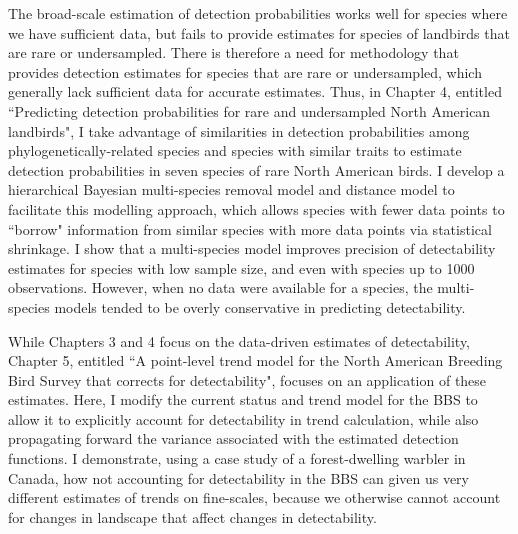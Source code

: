 \par The broad-scale estimation of detection probabilities works well for species where we have sufficient data, but fails to provide estimates for species of landbirds that are rare or undersampled.
There is therefore a need for methodology that provides detection estimates for species that are rare or undersampled, which generally lack sufficient data for accurate estimates. 
Thus, in Chapter 4, entitled ``Predicting detection probabilities for rare and undersampled North American landbirds", I take advantage of similarities in detection probabilities among phylogenetically-related species and species with similar traits to estimate detection probabilities in seven species of rare North American birds.
I develop a hierarchical Bayesian multi-species removal model and distance model to facilitate this modelling approach, which allows species with fewer data points to ``borrow" information from similar species with more data points via statistical shrinkage. 
I show that a multi-species model improves precision of detectability estimates for species with low sample size, and even with species up to 1000 observations.
However, when no data were available for a species, the multi-species models tended to be overly conservative in predicting detectability. 

\par While Chapters 3 and 4 focus on the data-driven estimates of detectability, Chapter 5, entitled ``A point-level trend model for the North American Breeding Bird Survey that corrects for detectability", focuses on an application of these estimates.
Here, I modify the current status and trend model for the BBS \citep{smith_spatially_2023} to allow it to explicitly account for detectability in trend calculation, while also propagating forward the variance associated with the estimated detection functions.
I demonstrate, using a case study of a forest-dwelling warbler in Canada, how not accounting for detectability in the BBS can given us very different estimates of trends on fine-scales, because we otherwise cannot account for changes in landscape that affect changes in detectability.

